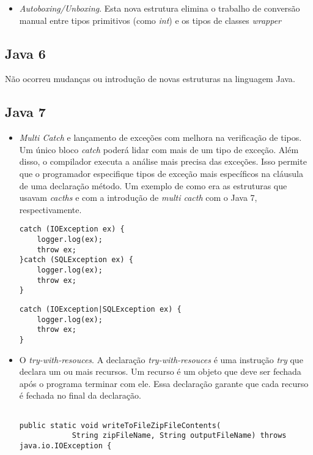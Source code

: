 \begin{itemize}
	  \item {\it Autoboxing/Unboxing}. Esta nova estrutura elimina o trabalho de conversão manual entre tipos primitivos (como {\it int}) e os tipos de classes {\it wrapper}
  \end{itemize}
  
  
  
	\subsection {Java 6}
		Não ocorreu mudanças ou introdução de novas estruturas na linguagem Java\cite{JSE8_Enhancements}.
	
	\subsection {Java 7}
		\begin{itemize}
		  \item {\it Multi Catch} e lançamento de exceções com melhora na verificação de tipos. Um único bloco {\it catch} poderá lidar com mais de um tipo de exceção. Além disso, o compilador executa a análise mais precisa das exceções. Isso permite que o programador especifique tipos de exceção mais específicos na cláusula de uma declaração método. Um exemplo de como era as estruturas que usavam {\it cacths} e com a introdução de {\it multi cacth} com o Java 7\cite{JSE7}, respectivamente.
  

\begin{lstlisting}
catch (IOException ex) {
	logger.log(ex);
	throw ex;
}catch (SQLException ex) {
	logger.log(ex);
	throw ex;
}
\end{lstlisting}
\clearpage
\begin{lstlisting}
catch (IOException|SQLException ex) {
	logger.log(ex);
	throw ex;
}
\end{lstlisting}


 \item O {\it try-with-resouces}. A declaração {\it try-with-resouces} é uma instrução {\it try} que declara um ou mais recursos. Um recurso é um objeto que deve ser fechada após o programa terminar com ele. Essa declaração garante que cada recurso é fechada no final da declaração\cite{JSE7_Advanced}.
	 
\begin{lstlisting}

public static void writeToFileZipFileContents(
			String zipFileName, String outputFileName) throws java.io.IOException {
	

\end{lstlisting}
\end{itemize}
